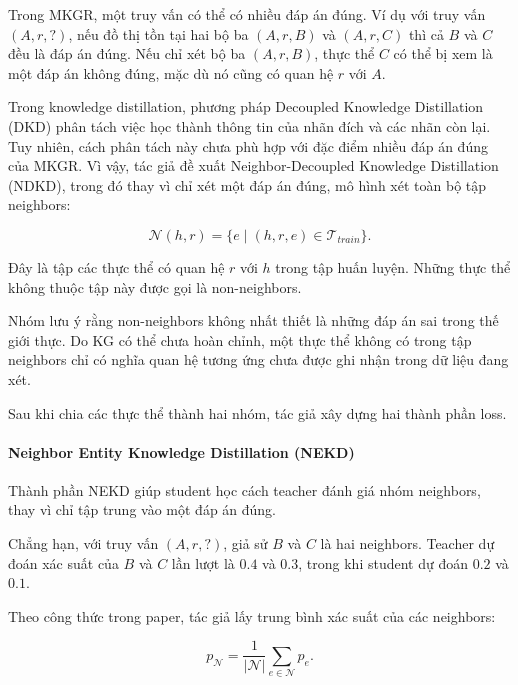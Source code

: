 Trong MKGR, một truy vấn có thể có nhiều đáp án đúng. Ví dụ với truy vấn $(A,r,?)$, nếu đồ thị tồn tại hai bộ ba $(A,r,B)$ và $(A,r,C)$ thì cả $B$ và $C$ đều là đáp án đúng. Nếu chỉ xét bộ ba $(A,r,B)$, thực thể $C$ có thể bị xem là một đáp án không đúng, mặc dù nó cũng có quan hệ $r$ với $A$.

Trong knowledge distillation, phương pháp Decoupled Knowledge Distillation (DKD) phân tách việc học thành thông tin của nhãn đích và các nhãn còn lại. Tuy nhiên, cách phân tách này chưa phù hợp với đặc điểm nhiều đáp án đúng của MKGR. Vì vậy, tác giả đề xuất Neighbor-Decoupled Knowledge Distillation (NDKD), trong đó thay vì chỉ xét một đáp án đúng, mô hình xét toàn bộ tập neighbors:

\[
\mathcal{N}(h,r)=
\{e\mid(h,r,e)\in\mathcal{T}_{train}\}.
\]

Đây là tập các thực thể có quan hệ $r$ với $h$ trong tập huấn luyện. Những thực thể không thuộc tập này được gọi là non-neighbors.

Nhóm lưu ý rằng non-neighbors không nhất thiết
là những đáp án sai trong thế giới thực. Do KG
có thể chưa hoàn chỉnh, một thực thể không có
trong tập neighbors chỉ có nghĩa quan hệ tương
ứng chưa được ghi nhận trong dữ liệu đang xét.

Sau khi chia các thực thể thành hai nhóm, tác
giả xây dựng hai thành phần loss.










\paragraph{Neighbor Entity Knowledge Distillation (NEKD)}

Thành phần NEKD giúp student học cách teacher đánh giá nhóm neighbors, thay vì chỉ tập trung vào một đáp án đúng.

Chẳng hạn, với truy vấn $(A,r,?)$, giả sử $B$ và $C$ là hai neighbors. Teacher dự đoán xác suất của $B$ và $C$ lần lượt là $0.4$ và $0.3$, trong khi student dự đoán $0.2$ và $0.1$.

Theo công thức trong paper, tác giả lấy trung bình xác suất của các neighbors:

\begin{equation}
p_{\mathcal{N}}=
\frac{1}{|\mathcal{N}|}
\sum_{e\in\mathcal{N}}p_e.
\label{eq:nekd_mean}
\end{equation}

